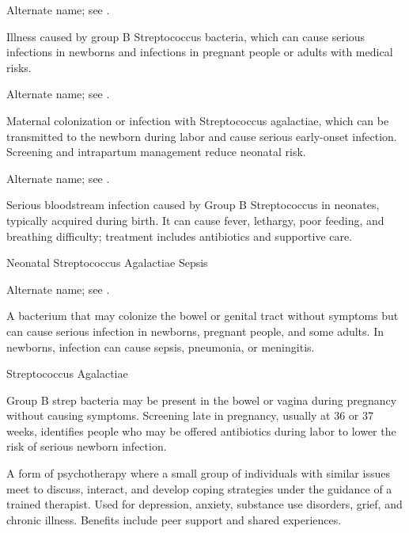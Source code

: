  Alternate name; see .

 Illness caused by group B Streptococcus bacteria, which can cause serious infections in newborns and infections in pregnant people or adults with medical risks.

 Alternate name; see .

 Maternal colonization or infection with Streptococcus agalactiae, which can be transmitted to the newborn during labor and cause serious early-onset infection. Screening and intrapartum management reduce neonatal risk.

 Alternate name; see .

 Serious bloodstream infection caused by Group B Streptococcus in neonates, typically acquired during birth. It can cause fever, lethargy, poor feeding, and breathing difficulty; treatment includes antibiotics and supportive care.

\synonyms
Neonatal Streptococcus Agalactiae Sepsis

 Alternate name; see .

 A bacterium that may colonize the bowel or genital tract without symptoms but can cause serious infection in newborns, pregnant people, and some adults. In newborns, infection can cause sepsis, pneumonia, or meningitis.

\synonyms
Streptococcus Agalactiae

 Group B strep bacteria may be present in the bowel or vagina during pregnancy without causing symptoms. Screening late in pregnancy, usually at 36 or 37 weeks, identifies people who may be offered antibiotics during labor to lower the risk of serious newborn infection.

 A form of psychotherapy where a small group of individuals with similar issues meet to discuss, interact, and develop coping strategies under the guidance of a trained therapist. Used for depression, anxiety, substance use disorders, grief, and chronic illness. Benefits include peer support and shared experiences.

